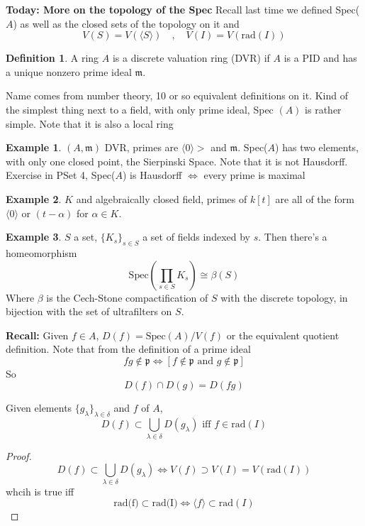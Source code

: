 \documentclass{article}
\theoremstyle{definition}
\newtheorem{example}{Example}[section]
\theoremstyle{definition}
\newtheorem{definition}{Definition}[section]
\theoremstyle{remark}
\newcommand{\mk}[1]{\mathfrak{#1}}
\newcommand{\ic}{\cap}
\begin{document}
\textbf{Today: More on the topology of the Spec}
Recall last time we defined Spec($A$) as well as the closed sets of the topology on it and 
\[V(S) = V(\langle S \rangle) \quad ,\quad V(I) = V(\text{rad}(I))\]
\begin{definition}
	A ring $A$ is a discrete valuation ring (DVR) if $A$ is a PID and has a unique nonzero prime ideal $\mk{m}$.
\end{definition}

Name comes from number theory, 10 or so equivalent definitions on it. 
Kind of the simplest thing next to a field, with only prime ideal, Spec $(A)$ is rather simple. 
Note that it is also a local ring

\begin{example}
	$(A, \mk{m})$ DVR, primes are $\langle 0 \rangle>$ and $\mk{m}$. Spec($A$) has two elements, with only one closed point, the Sierpinski Space. 
	Note that it is not Hausdorff.
	Exercise in PSet 4, Spec($A$) is Hausdorff $\Longleftrightarrow$ every prime is maximal
\end{example}

\begin{example}
	$K$ and algebraically closed field, primes of $k[t]$ are all of the form $\langle 0 \rangle$ or $(t - \alpha)$ for $\alpha \in K$.
\end{example}

\begin{example}
	$S$ a set, $\{K_s\}_{s \in S}$ a set of fields indexed by $s$.
	Then there's a homeomorphism
	\[\text{Spec}(\prod_{s \in S}K_s) \cong \beta(S)\]
	Where $\beta$ is the Cech-Stone compactification of $S$ with the discrete topology, in bijection with the set of ultrafilters on $S$.	
\end{example}

\textbf{Recall:} Given $f \in A$, $D(f) = \text{Spec}(A)/V(f)$ or the equivalent quotient definition.
Note that from the definition of a prime ideal
\[fg \notin \mk{p} \Longleftrightarrow [f \notin \mk{p} \text{ and } g \notin \mk{p}]\]
So
\[ D(f) \ic D(g) = D(fg)\]

\begin{lemm}{}{}
	Given elements $\{g_{\lambda}\}_{\lambda \in \delta}$ and $f$ of $A$,
	\[D(f) \subset \bigcup_{\lambda \in \delta} D(g_{\lambda}) \text{ iff } f \in \text{rad}(I)
	\]
\end{lemm}

\begin{proof}
	\[D(f) \subset \bigcup_{\lambda \in \delta} D(g_{\lambda}) \Longleftrightarrow V(f) \supset V(I) = V(\text{rad}(I))	\]
whcih is true iff 
\[\text{rad(f)} \subset \text{rad(I)} \Longleftrightarrow \langle f \rangle \subset \text{rad}(I)\] 
\end{proof}
\end{document}

